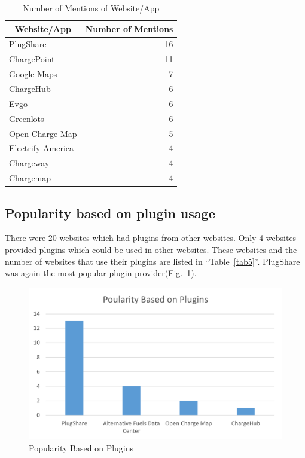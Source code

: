 \documentclass[conference]{IEEEtran}
\begin{document}
\begin{table}[htbp]
\caption{Number of Mentions of Website/App}
\begin{center}
\begin{tabular}{|l|r|}
\hline
\multicolumn{1}{|c|}{\textbf{Website/App}} & \multicolumn{1}{c|}{\textbf{Number of Mentions}} \\ \hline
PlugShare & 16 \\
ChargePoint & 11 \\
Google Maps & 7 \\
ChargeHub & 6 \\
Evgo & 6 \\
Greenlots & 6 \\
Open Charge Map & 5 \\
Electrify America & 4 \\
Chargeway & 4 \\
Chargemap & 4 \\ \hline
\end{tabular}
\label{tab4}
\end{center}
\end{table}

\subsection{Popularity based on plugin usage}
There were 20 websites which had plugins from other websites. Only 4 websites provided plugins which could be used in other websites. These websites and the number of websites that use their plugins are listed in ``Table~\ref{tab5}''. PlugShare was again the most popular plugin provider(Fig.~\ref{fig6}).

\begin{figure}[htbp]
\centerline{\includegraphics[width=\columnwidth]{Picture6.png}}
\caption{Popularity Based on Plugins}
\label{fig6}
\end{figure}
\end{document}
